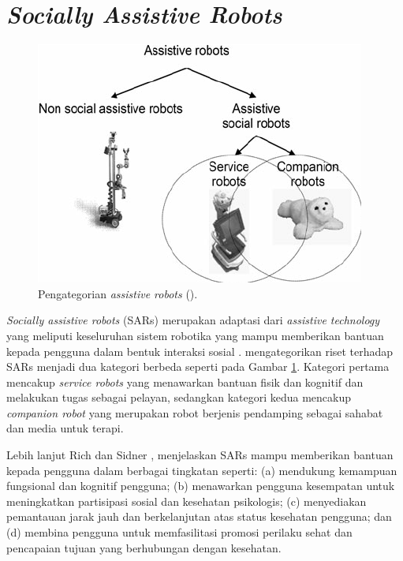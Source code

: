 \section{\emph{Socially Assistive Robots}}
\label{sec:sociallyassistiverobots}

\begin{figure}[ht]
  \centering
  \includegraphics[scale=0.35]{gambar/kategori-sars.png}
  \caption{Pengategorian \emph{assistive robots} (\citet{cit:heerink2010}).}
  \label{fig:kategorisars}
\end{figure}

\emph{Socially assistive robots} (SARs) merupakan adaptasi dari \emph{assistive technology} yang meliputi keseluruhan sistem robotika yang mampu memberikan bantuan kepada pengguna dalam bentuk interaksi sosial \citep{cit:seifer2005}. \citet{cit:heerink2010} mengategorikan riset terhadap SARs menjadi dua kategori berbeda seperti pada Gambar \ref{fig:kategorisars}.
Kategori pertama mencakup \emph{service robots} yang menawarkan bantuan fisik dan kognitif dan melakukan tugas sebagai pelayan, sedangkan kategori kedua mencakup \emph{companion robot} yang merupakan robot berjenis pendamping sebagai sahabat dan media untuk terapi.

Lebih lanjut Rich dan Sidner \citep{cit:rich2009}, menjelaskan SARs mampu memberikan bantuan kepada pengguna dalam berbagai tingkatan seperti:
(a) mendukung kemampuan fungsional dan kognitif pengguna;
(b) menawarkan pengguna kesempatan untuk meningkatkan partisipasi sosial dan kesehatan psikologis;
(c) menyediakan pemantauan jarak jauh dan berkelanjutan atas status kesehatan pengguna;
dan (d) membina pengguna untuk memfasilitasi promosi perilaku sehat dan pencapaian tujuan yang berhubungan dengan kesehatan.
